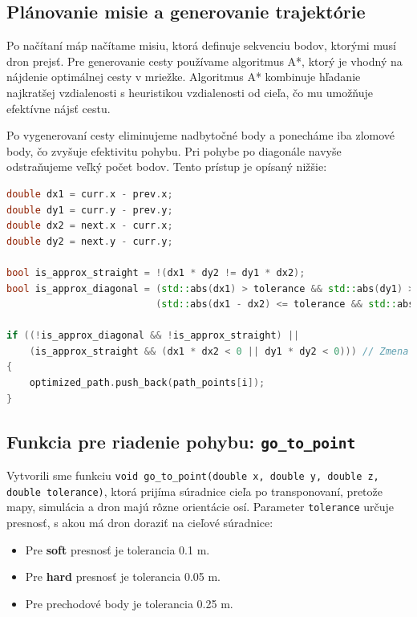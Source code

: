 \subsection{Plánovanie misie a generovanie trajektórie}
Po načítaní máp načítame misiu, ktorá definuje sekvenciu bodov, ktorými musí dron prejsť. Pre generovanie cesty používame algoritmus A*, ktorý je vhodný na nájdenie optimálnej cesty v mriežke. Algoritmus A* kombinuje hľadanie najkratšej vzdialenosti s heuristikou vzdialenosti od cieľa, čo mu umožňuje efektívne nájsť cestu.

Po vygenerovaní cesty eliminujeme nadbytočné body a ponecháme iba zlomové body, čo zvyšuje efektivitu pohybu. Pri pohybe po diagonále navyše odstraňujeme veľký počet bodov. Tento prístup je opísaný nižšie:

\begin{lstlisting}[language=C++, caption={Optimalizácia cesty - odstránenie bodov}]
double dx1 = curr.x - prev.x;
double dy1 = curr.y - prev.y;
double dx2 = next.x - curr.x;
double dy2 = next.y - curr.y;

bool is_approx_straight = !(dx1 * dy2 != dy1 * dx2);
bool is_approx_diagonal = (std::abs(dx1) > tolerance && std::abs(dy1) > tolerance) &&
                          (std::abs(dx1 - dx2) <= tolerance && std::abs(dy1 - dy2) <= tolerance);

if ((!is_approx_diagonal && !is_approx_straight) || 
    (is_approx_straight && (dx1 * dx2 < 0 || dy1 * dy2 < 0))) // Zmena smeru
{
    optimized_path.push_back(path_points[i]);
}
\end{lstlisting}

\subsection{Funkcia pre riadenie pohybu: \texttt{go\_to\_point}}
Vytvorili sme funkciu \texttt{void go\_to\_point(double x, double y, double z, double tolerance)}, ktorá prijíma súradnice cieľa po transponovaní, pretože mapy, simulácia a dron majú rôzne orientácie osí. Parameter \texttt{tolerance} určuje presnosť, s akou má dron doraziť na cieľové súradnice:

\begin{itemize}
    \item Pre \textbf{soft} presnosť je tolerancia 0.1 m.
    \item Pre \textbf{hard} presnosť je tolerancia 0.05 m.
    \item Pre prechodové body je tolerancia 0.25 m.
\end{itemize}

